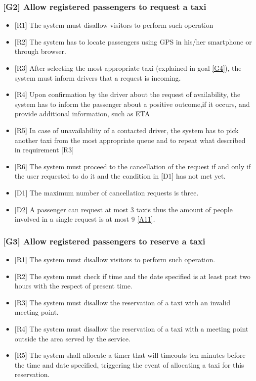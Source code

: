\documentclass[a4paper,12pt]{article}%
\begin{document}
\subsubsection{{[}G2{]} Allow registered passengers to request a taxi}
\label{goal2}
\begin{itemize}
\item {[}R1{]} The system must disallow visitors to perform such operation
\item {[}R2{]} The system has to locate passengers using GPS in his/her smartphone or through browser.
\item {[}R3{]} After selecting the most appropriate taxi (explained in goal \hyperref[goal4]{[G4]}), the system must inform drivers that a request is incoming.
\item {[}R4{]} Upon confirmation by the driver about the request of availability, the system has to inform the passenger about a positive outcome,if it occurs, and provide additional information, such as ETA
\item {[}R5{]} In case of unavailability of a contacted driver, the system has to pick another taxi from the most appropriate queue and to repeat what described in requirement [R3]
\item {[}R6{]} The system must proceed to the cancellation of the request if and only if the user requested to do it and the condition in [D1] has not met yet.
\item {[}D1{]} The maximum number of cancellation requests is three.
\item {[}D2{]} A passenger can request at most 3 taxis thus the amount of people involved in a single request is at most 9 \hyperref[a11]{{[}A11{]}}.
\end{itemize}
\subsubsection{{[}G3{]} Allow registered passengers to reserve a taxi}
\label{goal3}
\begin{itemize}
\item {[}R1{]} The system must disallow visitors to perform such operation.
\item {[}R2{]} The system must check if time and the date specified is at least past two hours with the respect of present time.
\item {[}R3{]} The system must disallow the reservation of a taxi with an invalid meeting point.
\item {[}R4{]} The system must disallow the reservation of a taxi with a meeting point outside the area served by the service.
\item {[}R5{]} The system shall allocate a timer that will timeouts ten minutes before the time and date specified, triggering the event of allocating a taxi for this reservation.
\end{itemize}
\end{document}
